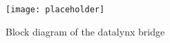 \documentclass[../bachelor_paper.tex]{subfiles}
\begin{document}
\begin{figure}
    \centering
    \texttt{[image: placeholder]}
    \caption{Block diagram of the datalynx bridge}
    \label{fig:arch/comm/block}
\end{figure}

\isstandalone



\fi
\end{document}
